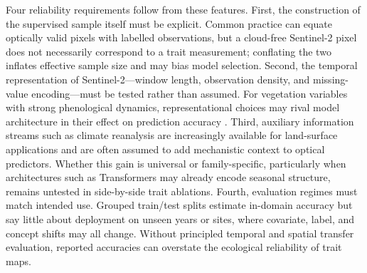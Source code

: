 \documentclass[final,times,onecolumn, authoryear]{elsarticle}
\begin{document}
\begin{linenumbers}
Four reliability requirements follow from these features. First, the construction of the supervised sample itself must be explicit. Common practice can equate optically valid pixels with labelled observations, but a cloud-free Sentinel-2 pixel does not necessarily correspond to a trait measurement; conflating the two inflates effective sample size and may bias model selection. Second, the temporal representation of Sentinel-2---window length, observation density, and missing-value encoding---must be tested rather than assumed. For vegetation variables with strong phenological dynamics, representational choices may rival model architecture in their effect on prediction accuracy \citep{russwurm2018multi, tian2021phenology}. Third, auxiliary information streams such as climate reanalysis are increasingly available for land-surface applications \citep{munozsabater2021era5land} and are often assumed to add mechanistic context to optical predictors. Whether this gain is universal or family-specific, particularly when architectures such as Transformers may already encode seasonal structure, remains untested in side-by-side trait ablations. Fourth, evaluation regimes must match intended use. Grouped train/test splits estimate in-domain accuracy but say little about deployment on unseen years or sites, where covariate, label, and concept shifts may all change. Without principled temporal and spatial transfer evaluation, reported accuracies can overstate the ecological reliability of trait maps.


\end{linenumbers}
\end{document}
